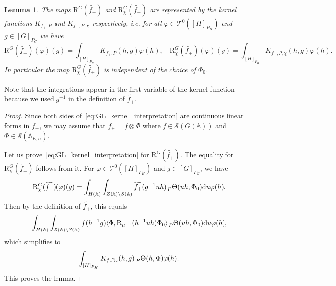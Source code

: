 \documentclass[letterpaper,11pt]{amsart}
\newcommand{\bA}{\mathbb{A}}
\newcommand{\cS}{\mathcal{S}}
\newcommand{\cT}{\mathcal{T}}
\newcommand{\rd}{\mathrm{d}}
\newcommand{\bs}{\backslash}
\newcommand{\<}{\negthickspace}
\theoremstyle{definition}
\theoremstyle{plain}
\newtheorem{lemma}[definition]{Lemma}
\theoremstyle{remark}
\numberwithin{equation}{section}
\begin{document}
\begin{lemma}   \label{lemma:interpretation_of_the_kernel}
The maps $\mathrm{R}^G(\widetilde{f_+})$ and
$\mathrm{R}_{\chi}^G(\widetilde{f_+})$ are represented by the kernel functions
$K_{f_+, P}$ and $K_{f_+, P, \chi}$ respectively, i.e. for all $\varphi \in
\cT^0([H]_{P_H})$ and $g \in [G]_{P_G}$ we have
    \begin{equation}    \label{eq:GL_kernel_interpretation}
    \mathrm{R}^G(\widetilde{f_+})(\varphi)(g) =
    \int_{[H]_{P_H}} K_{f_+, P}(h, g)\varphi(h), \quad
    \mathrm{R}^G_{\chi}(\widetilde{f_+})(\varphi)(g) =
    \int_{[H]_{P_H}} K_{f_+, P, \chi}(h, g)\varphi(h).
    \end{equation}
In particular the map $\mathrm{R}_{\chi}^G(\widetilde{f_+})$ is independent
of the choice of $\Phi_0$.
\end{lemma}


Note that the integrations appear in the first variable of the kernel function because we used $g^{-1}$
in the definition of $\widetilde{f_+}$.

\begin{proof}
Since both sides of~\eqref{eq:GL_kernel_interpretation} are continuous linear
forms in $f_+$, we may assume that $f_+ = f \otimes \Phi$ where $f \in
\cS(G(\bA))$ and $\Phi \in \cS(\bA_{E, n})$.

Let us prove~\eqref{eq:GL_kernel_interpretation} for
$\mathrm{R}^G(\widetilde{f_+})$. The equality for
$\mathrm{R}_{\chi}^G(\widetilde{f_+})$ follows from it. For
$\varphi \in \cT^0([H]_{P_H})$ and $g \in [G]_{P_G}$, we have
    \[
    \mathrm{R}_{\chi}^G(\widetilde{f_+})(\varphi)(g) =
    \int_{H(\bA)}\int_{Z(\bA) \bs S(\bA)} \widetilde{f_+}(g^{-1}uh)
     \prescript{}{P}{\Theta}(uh, \Phi_0) \rd u \varphi(h).
    \]
Then by the definition of $\widetilde{f_+}$, this equals
    \[
    \int_{H(\bA)} \int_{Z(\bA) \bs S(\bA)} f(h^{-1} g)
    \langle \Phi, \mathrm{R}_{\mu^{-1}}(h^{-1}uh) \Phi_0 \rangle
    \prescript{}{P}{\Theta}(uh, \Phi_0) \rd u \varphi(h),
    \]
which simplifies to
    \[
    \int_{[H]_{P_H}} K_{f, P_G}(h, g)
    \prescript{}{P}{\Theta}(h, \Phi) \varphi(h).
    \]
This proves the lemma.
\end{proof}
\end{document}
